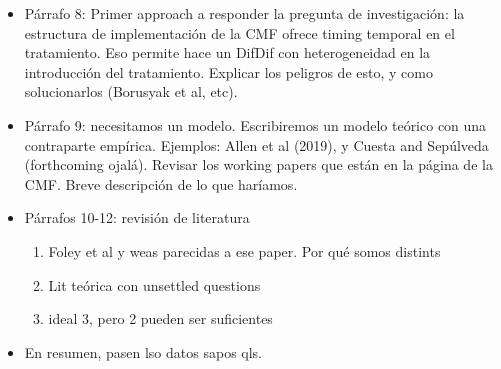\documentclass[11pt]{article}
\theoremstyle{plain}
\theoremstyle{plain}
\begin{document}
\begin{itemize}
    \item Párrafo 8: Primer approach a responder la pregunta de investigación: la estructura de implementación de la CMF ofrece timing temporal en el tratamiento. Eso permite hace un DifDif con heterogeneidad en la introducción del tratamiento. Explicar los peligros de esto, y como solucionarlos (Borusyak et al, etc). 

    \item Párrafo 9: necesitamos un modelo. Escribiremos un modelo teórico con una contraparte empírica. Ejemplos: Allen et al (2019), y Cuesta and Sepúlveda (forthcoming ojalá). Revisar los working papers que están en la página de la CMF. Breve descripción de lo que haríamos.

    \item Párrafos 10-12: revisión de literatura
    \begin{enumerate}
        \item Foley et al y weas parecidas a ese paper. Por qué somos distints
        \item Lit teórica con unsettled questions
        \item ideal 3, pero 2 pueden ser suficientes
    \end{enumerate}
    \item En resumen, pasen lso datos sapos qls.
\end{itemize}


    \newpage
\end{document}
